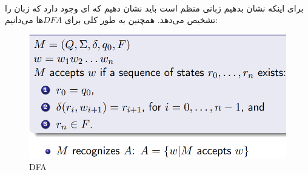 \\[0.1in]
برای اینکه نشان بدهیم زبانی منظم است باید نشان دهیم که 
ای وجود دارد که زبان را تشخیص 
می‌دهد. همچنین به طور کلی برای $DFA$ها می‌دانیم:
\\
\begin{figure} [H]
    \centering
    \includegraphics[scale=0.65]{solution/5-1.png}
    \caption{DFA}
    \label{dfa}
\end{figure}
